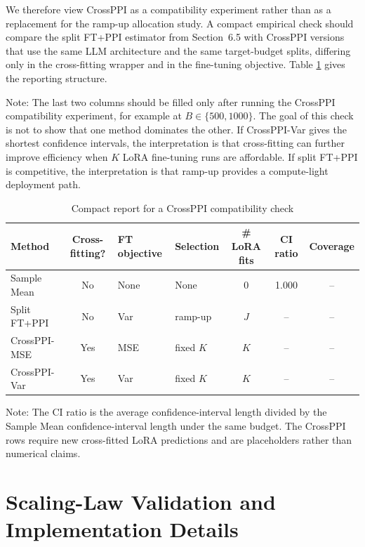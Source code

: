 \documentclass[11pt]{article}
\newcommand{\NA}{\multicolumn{1}{c}{--}}
\begin{document}
We therefore view CrossPPI as a compatibility experiment rather than as a replacement for the
ramp-up allocation study. A compact empirical check should compare the split FT+PPI estimator from
Section~6.5 with CrossPPI versions that use the same LLM architecture and the same target-budget
splits, differing only in the cross-fitting wrapper and in the fine-tuning objective. Table
\ref{tab:crossppi_compatibility} gives the reporting structure. 

Note: The last two columns should be
filled only after running the CrossPPI compatibility experiment, for example at
$B\in\{500,1000\}$. The goal of this check is not to show that one method dominates the other.
If CrossPPI-Var gives the shortest confidence intervals, the interpretation is that cross-fitting
can further improve efficiency when $K$ LoRA fine-tuning runs are affordable. If split FT+PPI is
competitive, the interpretation is that ramp-up provides a compute-light deployment path.

\begin{table}[H]
\centering
\caption{Compact report for a CrossPPI compatibility check}
\label{tab:crossppi_compatibility}
\scriptsize
\setlength{\tabcolsep}{4.0pt}
\renewcommand{\arraystretch}{1.08}
\begin{tabularx}{\textwidth}{@{}l c l l c c c@{}}
\toprule
Method & Cross-fitting? & FT objective & Selection & \# LoRA fits & CI ratio & Coverage \\
\midrule
Sample Mean & No & None & None & 0 & 1.000 & \NA \\
Split FT+PPI & No & Var & ramp-up & $J$ & \NA & \NA \\
CrossPPI-MSE & Yes & MSE & fixed $K$ & $K$ & \NA & \NA \\
CrossPPI-Var & Yes & Var & fixed $K$ & $K$ & \NA & \NA \\
\bottomrule
\end{tabularx}
\vspace{0.5em}

\begin{minipage}{0.96\textwidth}
\footnotesize
Note: The CI ratio is the average confidence-interval length divided by the Sample Mean
confidence-interval length under the same budget. The CrossPPI rows require new cross-fitted LoRA
predictions and are placeholders rather than numerical claims.
\end{minipage}
\end{table}

\appendix
\section{Scaling-Law Validation and Implementation Details}
\label{app:scaling_details}
\end{document}
